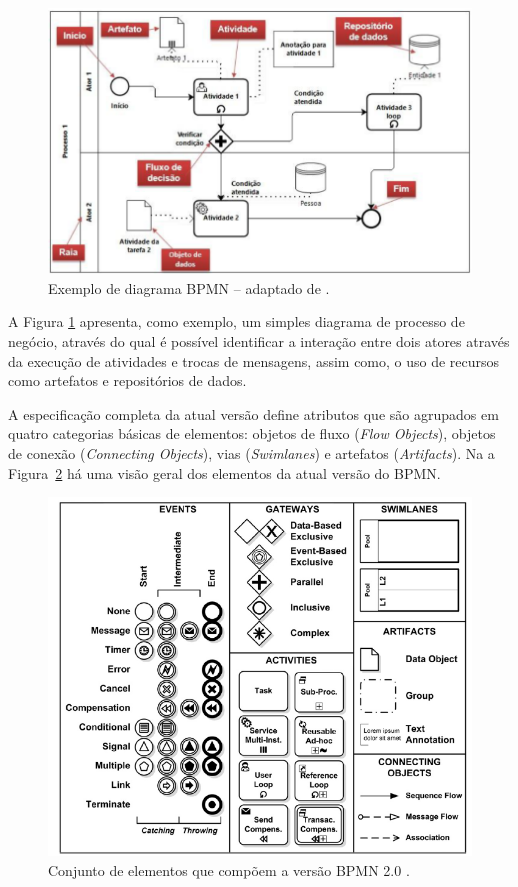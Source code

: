 \begin{figure}[!ht]
\centering
\includegraphics[scale=0.5]{images/diagrama.png}
\caption{Exemplo de diagrama BPMN – adaptado de \cite{Weske2012}.}
\label{diag}
\end{figure}

A Figura \ref{diag} apresenta, como exemplo, um simples diagrama de processo de negócio, através do qual é possível identificar a interação entre dois atores através da execução de atividades e trocas de mensagens, assim como, o uso de recursos como artefatos e repositórios de dados.

A especificação completa da atual versão define atributos que são agrupados em quatro categorias básicas de elementos: objetos de fluxo (\textit{Flow Objects}), objetos de conexão (\textit{Connecting Objects}), vias (\textit{Swimlanes}) e artefatos (\textit{Artifacts}). 
Na a Figura~\ref{elementos} há uma visão geral dos elementos da atual versão do BPMN.

\begin{figure}[!ht]
\centering
\includegraphics[scale=0.5]{images/elementos.png}
\caption{Conjunto de elementos que compõem a versão BPMN 2.0 \cite{object2016business}.}
\label{elementos}
\end{figure}

